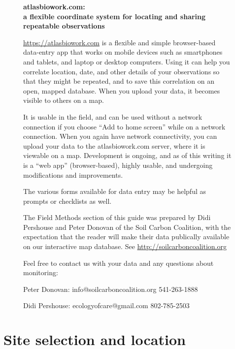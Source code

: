 \documentclass[11pt,letterpaper,twoside,onecolumn]{memoir}
\begin{document}
\begin{figure}
\begin{tcolorbox}
\setlength{\parskip}{.7em}
\textbf{atlasbiowork.com: \\a flexible coordinate system for locating and sharing repeatable observations}

\url{https://atlasbiowork.com} is a flexible and simple browser-based data-entry app that works on mobile devices such as smartphones and tablets, and laptop or desktop computers. Using it can help you correlate location, date, and other details of your observations so that they might be repeated, and to save this correlation on an open, mapped database. When you upload your data, it becomes visible to others on a map.

It is usable in the field, and can be used without a network connection if you choose ``Add to home screen'' while on a network connection. When you again have network connectivity, you can upload your data to the atlasbiowork.com server, where it is viewable on a map. Development is ongoing, and as of this writing it is a ``web app'' (browser-based), highly usable, and undergoing modifications and improvements.

The various forms available for data entry may be helpful as prompts or checklists as well.
\end{tcolorbox}
\end{figure}

\begin{figure}[h]
\begin{framed}
\small The Field Methods section of this guide was prepared by Didi Pershouse and Peter Donovan of the Soil Carbon Coalition, with the expectation that the reader will make their data publically available on our interactive map database. See \url{http://soilcarboncoalition.org}

Feel free to contact us with your data and any questions about monitoring: 

Peter Donovan: info@soilcarboncoalition.org 541-263-1888

Didi Pershouse: ecologyofcare@gmail.com  802-785-2503

\end{framed}
\end{figure}



\chapter{Site selection and location}
\end{document}
